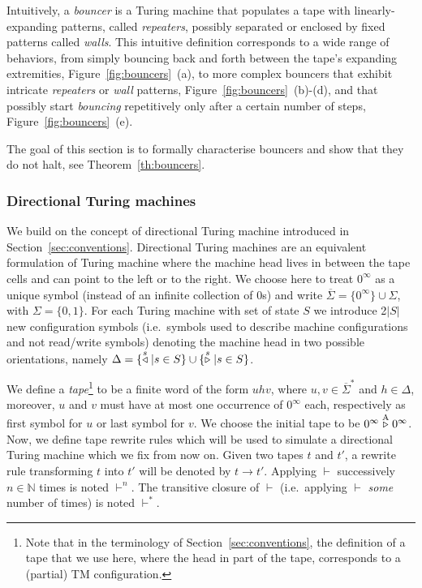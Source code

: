 Intuitively, a \emph{bouncer} is a Turing machine that populates a tape with
linearly-expanding patterns, called \textit{repeaters}, possibly separated or enclosed by fixed patterns called \textit{walls}. This intuitive definition corresponds to a wide range of behaviors, from simply bouncing back and forth between the tape's expanding extremities, Figure~\ref{fig:bouncers}~(a), to more complex bouncers that exhibit intricate \textit{repeaters} or \textit{wall} patterns, Figure~\ref{fig:bouncers}~(b)-(d), and that possibly start \textit{bouncing} repetitively only after a certain number of steps, Figure~\ref{fig:bouncers}~(e).

The goal of this section is to formally characterise bouncers and show that they do not halt, see Theorem~\ref{th:bouncers}.

\subsubsection{Directional Turing machines}\label{sec:bouncers:directionalTM}

We build on the concept of directional Turing machine introduced in Section~\ref{sec:conventions}. Directional Turing machines are an equivalent formulation of Turing machine where the machine head lives in between the tape cells and can point to the left or to the right. We choose here to treat $0^\infty$ as a unique symbol (instead of an infinite collection of 0s) and write $\overline{\Sigma} = \{0^\infty\}\cup\Sigma$, with $\Sigma=\{0,1\}$. For each Turing machine with set of state $S$ we introduce 2$|S|$ new configuration symbols (i.e.\ symbols used to describe machine configurations and not read/write symbols) denoting the machine head in two possible orientations, namely $\Delta = \{\stackrel{s}\triangleleft | s\in S\}\cup\{\stackrel{s}\triangleright| s \in S\}$.

We define a \textit{tape}\footnote{Note that in the terminology of Section~\ref{sec:conventions}, the definition of a tape that we use here, where the head in part of the tape, corresponds to a (partial) TM configuration.} to be a finite word of the form $uhv$, where $u,v\in \overline{\Sigma}^*$ and $h\in\Delta$, moreover, $u$ and $v$ must have at most one occurrence of $0^\infty$ each, respectively as first symbol for $u$ or last symbol for $v$. We choose the initial tape to be $0^\infty \stackrel{\text{A}}\triangleright 0^\infty$. Now, we define tape rewrite rules which will be used to simulate a directional Turing machine which we fix from now on. Given two tapes $t$ and $t'$, a rewrite rule transforming $t$ into $t'$ will be denoted by $t\to t'$. Applying $\vdash$ successively $n\in\mathbb{N}$ times is noted $\vdash^n$. The transitive closure of $\vdash$ (i.e.\ applying $\vdash$ \textit{some} number of times) is noted $\vdash^*$.

